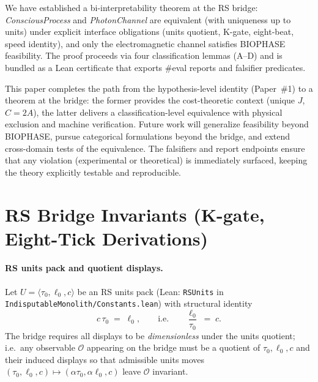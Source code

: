 \documentclass[12pt,a4paper]{article}
\begin{document}
We have established a bi-interpretability theorem at the RS bridge: \emph{ConsciousProcess} and \emph{PhotonChannel} are equivalent (with uniqueness up to units) under explicit interface obligations (units quotient, K-gate, eight-beat, speed identity), and only the electromagnetic channel satisfies BIOPHASE feasibility. The proof proceeds via four classification lemmas (A--D) and is bundled as a Lean certificate that exports \#eval reports and falsifier predicates. 

This paper completes the path from the hypothesis-level identity (Paper~\#1) to a theorem at the bridge: the former provides the cost-theoretic context (unique \(J\), \(C{=}2A\)), the latter delivers a classification-level equivalence with physical exclusion and machine verification. Future work will generalize feasibility beyond BIOPHASE, pursue categorical formulations beyond the bridge, and extend cross-domain tests of the equivalence. The falsifiers and report endpoints ensure that any violation (experimental or theoretical) is immediately surfaced, keeping the theory explicitly testable and reproducible.

\appendix

\section{RS Bridge Invariants (K-gate, Eight-Tick Derivations)}
\label{app:rs-bridge-invariants}

\paragraph{RS units pack and quotient displays.}
Let \(U=\langle \tau_0,\ell_0,c\rangle\) be an RS units pack (Lean: \texttt{RSUnits} in \texttt{IndisputableMonolith/Constants.lean}) with structural identity
\begin{equation}
  c\,\tau_0 \;=\; \ell_0,
  \qquad\text{i.e.}\qquad
  \frac{\ell_0}{\tau_0} \;=\; c.
\end{equation}
The bridge requires all displays to be \emph{dimensionless} under the units quotient; i.e.\ any observable \(\mathcal{O}\) appearing on the bridge must be a quotient of \(\tau_0,\ell_0,c\) and their induced displays so that admissible units moves \((\tau_0,\ell_0,c)\mapsto (\alpha\tau_0,\alpha\ell_0,c)\) leave \(\mathcal{O}\) invariant.
\end{document}
